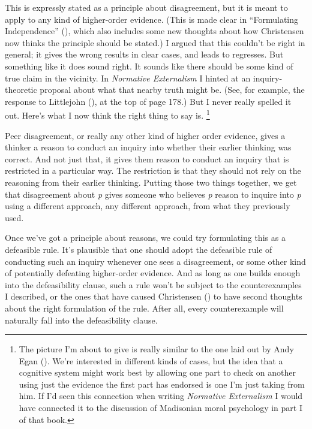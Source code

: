 \documentclass[
  12pt,
  letterpaper,
]{scrbook}
\begin{document}
This is expressly stated as a principle about disagreement, but it is
meant to apply to any kind of higher-order evidence. (This is made clear
in ``Formulating Independence''
(), which also includes
some new thoughts about how Christensen now thinks the principle should
be stated.) I argued that this couldn't be right in general; it gives
the wrong results in clear cases, and leads to regresses. But something
like it does sound right. It sounds like there should be some kind of
true claim in the vicinity. In \emph{Normative Externalism} I hinted at
an inquiry-theoretic proposal about what that nearby truth might be.
(See, for example, the response to Littlejohn
(), at the top of page 178.) But I
never really spelled it out. Here's what I now think the right thing to
say is. \footnote{The picture I'm about to give is really similar to the
  one laid out by Andy Egan (). We're
  interested in different kinds of cases, but the idea that a cognitive
  system might work best by allowing one part to check on another using
  just the evidence the first part has endorsed is one I'm just taking
  from him. If I'd seen this connection when writing \emph{Normative
  Externalism} I would have connected it to the discussion of Madisonian
  moral psychology in part I of that book.}

Peer disagreement, or really any other kind of higher order evidence,
gives a thinker a reason to conduct an inquiry into whether their
earlier thinking was correct. And not just that, it gives them reason to
conduct an inquiry that is restricted in a particular way. The
restriction is that they should not rely on the reasoning from their
earlier thinking. Putting those two things together, we get that
disagreement about \emph{p} gives someone who believes \emph{p} reason
to inquire into \emph{p} using a different approach, any different
approach, from what they previously used.

Once we've got a principle about reasons, we could try formulating this
as a defeasible rule. It's plausible that one should adopt the
defeasible rule of conducting such an inquiry whenever one sees a
disagreement, or some other kind of potentially defeating higher-order
evidence. And as long as one builds enough into the defeasibility
clause, such a rule won't be subject to the counterexamples I described,
or the ones that have caused Christensen
() to have second thoughts about the
right formulation of the rule. After all, every counterexample will
naturally fall into the defeasibility clause.
\end{document}
